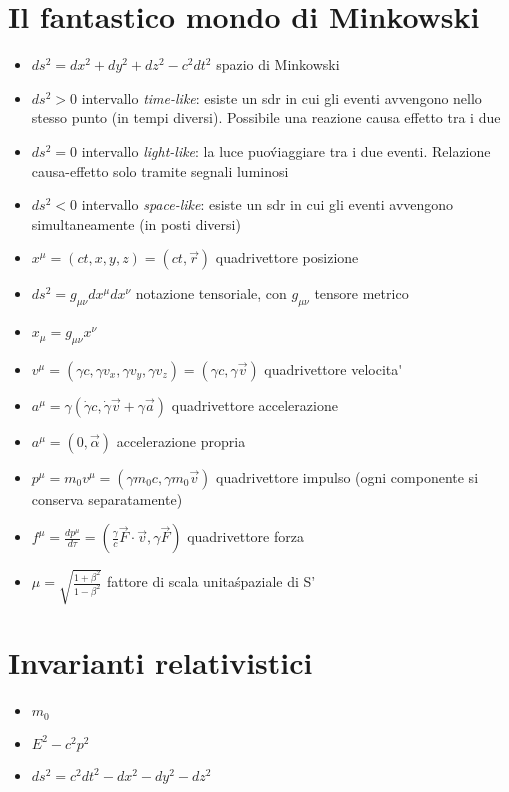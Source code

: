 \documentclass[a4paper]{article}
\begin{document}
	\section{Il fantastico mondo di Minkowski}
        \begin{itemize}
            \item $ds^2=dx^2+dy^2+dz^2-c^2dt^2$ spazio di Minkowski
            \item $ds^2>0$ intervallo \textit{time-like}: esiste un sdr in cui gli eventi avvengono nello stesso punto (in tempi diversi).
                Possibile una reazione causa effetto tra i due
            \item $ds^2=0$ intervallo \textit{light-like}: la luce puo\' viaggiare tra i due eventi. Relazione causa-effetto solo tramite segnali luminosi
            \item $ds^2<0$ intervallo \textit{space-like}: esiste un sdr in cui gli eventi avvengono simultaneamente (in posti diversi)
            \item $x^\mu=(ct,x,y,z)=(ct,\vec{r})$ quadrivettore posizione
            \item $ds^2=g_{\mu\nu}dx^\mu d x^\nu$ notazione tensoriale, con $g_{\mu\nu}$ tensore metrico
            \item $x_\mu=g_{\mu\nu}x^\nu$
            \item $v^\mu=(\gamma c, \gamma v_x, \gamma v_y, \gamma v_z)=(\gamma c, \gamma\vec{v})$ quadrivettore velocita\'
            \item $a^\mu=\gamma(\dot{\gamma}c, \dot{\gamma}\vec{v}+\gamma\vec{a})$ quadrivettore accelerazione
            \item $a^\mu=(0, \vec{\alpha})$ accelerazione propria
            \item $p^\mu=m_0v^\mu=(\gamma m_0c, \gamma m_0\vec{v})$ quadrivettore impulso (ogni componente si conserva separatamente)
            \item $f^\mu=\frac{dp^\mu}{d\tau}=\left(\frac{\gamma}{c}\vec{F}\cdot\vec{v}, \gamma\vec{F}\right)$ quadrivettore forza
            \item $\mu=\sqrt{\frac{1+\beta^2}{1-\beta^2}}$ fattore di scala unita\' spaziale di S'
        \end{itemize}
    \section{Invarianti relativistici}
        \begin{itemize}
            \item $m_0$
            \item $E^2-c^2p^2$
            \item $ds^2=c^2dt^2-dx^2-dy^2-dz^2$
        \end{itemize}
\end{document}
